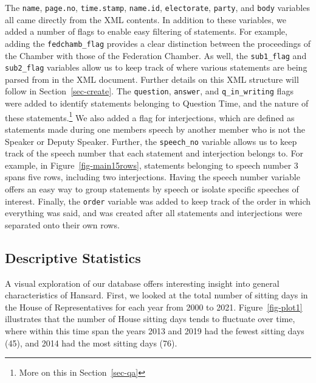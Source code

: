 \documentclass[
  letterpaper,
  DIV=11,
  numbers=noendperiod]{scrartcl}
\begin{document}
The \texttt{name}, \texttt{page.no}, \texttt{time.stamp},
\texttt{name.id}, \texttt{electorate}, \texttt{party}, and \texttt{body}
variables all came directly from the XML contents. In addition to these
variables, we added a number of flags to enable easy filtering of
statements. For example, adding the \texttt{fedchamb\_flag} provides a
clear distinction between the proceedings of the Chamber with those of
the Federation Chamber. As well, the \texttt{sub1\_flag} and
\texttt{sub2\_flag} variables allow us to keep track of where various
statements are being parsed from in the XML document. Further details on
this XML structure will follow in Section~\ref{sec-create}. The
\texttt{question}, \texttt{answer}, and \texttt{q\_in\_writing} flags
were added to identify statements belonging to Question Time, and the
nature of these statements.\footnote{More on this in
  Section~\ref{sec-qa}} We also added a flag for interjections, which
are defined as statements made during one members speech by another
member who is not the Speaker or Deputy Speaker. Further, the
\texttt{speech\_no} variable allows us to keep track of the speech
number that each statement and interjection belongs to. For example, in
Figure~\ref{fig-main15rows}, statements belonging to speech number 3
spans five rows, including two interjections. Having the speech number
variable offers an easy way to group statements by speech or isolate
specific speeches of interest. Finally, the \texttt{order} variable was
added to keep track of the order in which everything was said, and was
created after all statements and interjections were separated onto their
own rows.

\hypertarget{sec-stats}{%
\subsection{Descriptive Statistics}\label{sec-stats}}

A visual exploration of our database offers interesting insight into
general characteristics of Hansard. First, we looked at the total number
of sitting days in the House of Representatives for each year from 2000
to 2021. Figure~\ref{fig-plot1} illustrates that the number of House
sitting days tends to fluctuate over time, where within this time span
the years 2013 and 2019 had the fewest sitting days (45), and 2014 had
the most sitting days (76).
\end{document}
